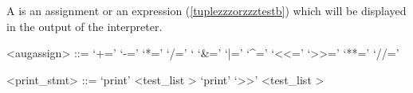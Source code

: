 
A  is an assignment or an expression (\ref{tuplezzzorzzztestb}) which will be displayed in the output of the interpreter.

\label{augassignb}

\begin{grammar}
<augassign> ::= `+='
	\alt `-='
	\alt `*='
	\alt `/='
	\alt `%
	\alt `&='
	\alt `|='
	\alt `^='
	\alt `<<='
	\alt `>>='
	\alt `**='
	\alt `//='
\end{grammar}


\label{printzzzstmtb}

\begin{grammar}
<print_stmt> ::= `print' <test_list \myref[testzzzlistb]>
	\alt `print' `>>' <test_list \myref[testzzzlistb]>
\end{grammar}


